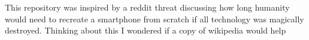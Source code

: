 This repository was inspired by a reddit threat discussing how long humanity would need to recreate a smartphone from scratch if all technology was magically destroyed. Thinking about this I wondered if a copy of wikipedia would help 
